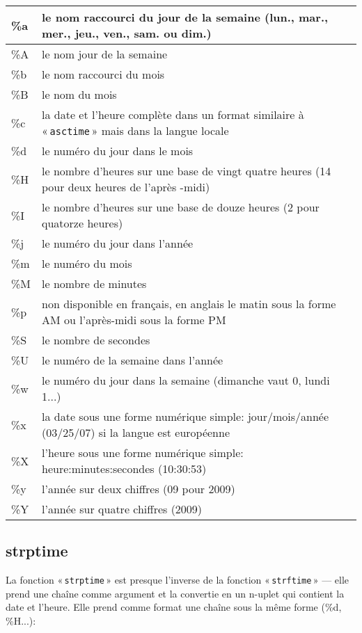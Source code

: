 \begin{center}
\begin{tabular}{|l|p{12cm}|}
\hline
\%a & le nom raccourci du jour de la semaine (lun., mar., mer., jeu., ven., sam. ou dim.) \\
\hline
\%A & le nom jour de la semaine  \\
\hline
\%b & le nom raccourci du mois \\
\hline
\%B & le nom du mois \\
\hline
\%c & la date et l'heure complète dans un format similaire à « \texttt{asctime} » mais dans la langue locale\\
\hline
\%d & le numéro du jour dans le mois\\
\hline
\%H & le nombre d'heures sur une base de vingt quatre heures (14 pour deux heures de l'après -midi) \\
\hline
\%I & le nombre d'heures sur une base de douze heures (2 pour quatorze heures)\\
\hline
\%j & le numéro du jour dans l'année\\
\hline
\%m & le numéro du mois \\
\hline
\%M & le nombre de minutes \\
\hline
\%p & non disponible en français, en anglais le matin sous la forme AM ou l'après-midi sous la forme PM \\
\hline
\%S & le nombre de secondes\\
\hline
\%U & le numéro de la semaine dans l'année \\
\hline
\%w & le numéro du jour dans la semaine (dimanche vaut 0, lundi 1...) \\
\hline
\%x & la date sous une forme numérique simple: jour/mois/année (03/25/07) si la langue est européenne  \\
\hline
\%X & l'heure sous une forme numérique simple: heure:minutes:secondes (10:30:53) \\
\hline
\%y & l'année sur deux chiffres (09 pour 2009) \\
\hline
\%Y & l'année sur quatre chiffres (2009) \\
\hline
\end{tabular}
\end{center}
\subsection{strptime}

La fonction « \texttt{strptime} » est presque l'inverse de la fonction « \texttt{strftime} » --- elle prend une chaîne comme argument et la convertie en un n-uplet qui contient la date et l'heure. Elle prend comme format une chaîne sous la même forme (\%d, \%H...):


